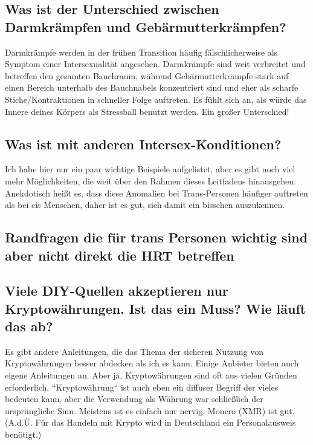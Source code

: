 \documentclass{article}
\begin{document}
\subsection{Was ist der Unterschied zwischen Darmkrämpfen und Gebärmutterkrämpfen?}\label{11-35}

Darmkrämpfe werden in der frühen Transition häufig fälschlicherweise als Symptom einer Intersexualität angesehen. Darmkrämpfe sind weit verbreitet und betreffen den gesamten Bauchraum, während Gebärmutterkrämpfe stark auf einen Bereich unterhalb des Bauchnabels konzentriert sind und eher als scharfe Stiche/Kontraktionen in schneller Folge auftreten. Es fühlt sich an, als würde das Innere deines Körpers als Stressball benutzt werden. Ein großer Unterschied!

\subsection{Was ist mit anderen Intersex-Konditionen?}

Ich habe hier nur ein paar wichtige Beispiele aufgelistet, aber es gibt noch viel mehr Möglichkeiten, die weit über den Rahmen dieses Leitfadens hinausgehen. Anekdotisch heißt es, dass diese Anomalien bei Trans-Personen häufiger auftreten als bei cis Menschen, daher ist es gut, sich damit ein bisschen auszukennen.

\subsection*{Randfragen die für trans Personen wichtig sind aber nicht direkt die HRT betreffen}

\subsection{Viele DIY-Quellen akzeptieren nur Kryptowährungen. Ist das ein Muss? Wie läuft das ab?}

Es gibt andere Anleitungen, die das Thema der sicheren Nutzung von Kryptowährungen besser abdecken als ich es kann. Einige Anbieter bieten auch eigene Anleitungen an. Aber ja, Kryptowährungen sind oft aus vielen Gründen erforderlich. “Kryptowährung“ ist auch eben ein diffuser Begriff der vieles bedeuten kann, aber die Verwendung als Währung war schließlich der ursprüngliche Sinn. Meistens ist es einfach nur nervig. Monero (XMR) ist gut. (A.d.Ü. Für das Handeln mit Krypto wird in Deutschland ein Personalausweis benötigt.)
\end{document}
